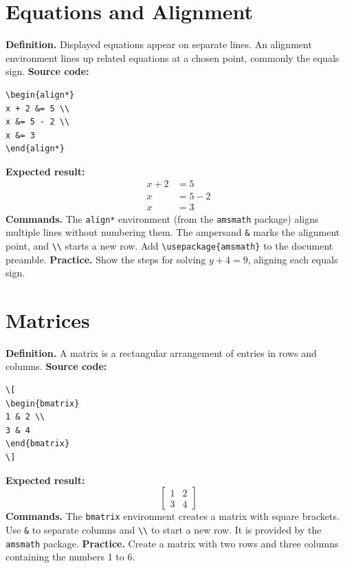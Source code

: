 \documentclass[11pt]{article}
\begin{document}
\section{Equations and Alignment}
\textbf{Definition.} Displayed equations appear on separate lines. An alignment environment lines up related equations at a chosen point, commonly the equals sign.
\textbf{Source code:}
\begin{verbatim}
\begin{align*}
x + 2 &= 5 \\
x &= 5 - 2 \\
x &= 3
\end{align*}
\end{verbatim}
\textbf{Expected result:}
\begin{align*}
x + 2 &= 5 \\
x &= 5 - 2 \\
x &= 3
\end{align*}
\textbf{Commands.} The \verb|align*| environment (from the \verb|amsmath| package) aligns multiple lines without numbering them. The ampersand \verb|&| marks the alignment point, and \verb|\\| starts a new row. Add \verb|\usepackage{amsmath}| to the document preamble.
\textbf{Practice.} Show the steps for solving $y+4=9$, aligning each equals sign.

\section{Matrices}
\textbf{Definition.} A matrix is a rectangular arrangement of entries in rows and columns.
\textbf{Source code:}
\begin{verbatim}
\[
\begin{bmatrix}
1 & 2 \\
3 & 4
\end{bmatrix}
\]
\end{verbatim}
\textbf{Expected result:}
\[
\begin{bmatrix}
1 & 2 \\
3 & 4
\end{bmatrix}
\]
\textbf{Commands.} The \verb|bmatrix| environment creates a matrix with square brackets. Use \verb|&| to separate columns and \verb|\\| to start a new row. It is provided by the \verb|amsmath| package.
\textbf{Practice.} Create a matrix with two rows and three columns containing the numbers 1 to 6.
\end{document}
